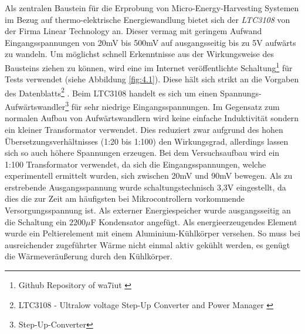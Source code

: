 \documentclass[12pt]{scrreprt} %
\begin{document}
Als zentralen Baustein für die Erprobung von Micro-Energy-Harvesting Systemen im Bezug auf thermo-elektrische Energiewandlung bietet sich der \textit{LTC3108} von der Firma Linear Technology an. Dieser vermag mit geringem Aufwand Eingangsspannungen von 20mV bis 500mV auf ausgangsseitig bis zu 5V aufwärts zu wandeln. Um möglichst schnell Erkenntnisse aus der Wirkungsweise des Bausteins ziehen zu können, wird eine im Internet veröffentlichte Schaltung\footnote{Github Repository of wa7iut \citep{git}} für Tests verwendet (siehe Abbildung \vref{fig:4.1}). Diese hält sich strikt an die Vorgaben des Datenblatts\footnote{LTC3108 - Ultralow voltage Step-Up Converter and Power Manager \citep{LTC}} \citep{LTC3108}. Beim LTC3108 handelt es sich um einen Spannungs-Aufwärtswandler\footnote{Step-Up-Converter} für sehr niedrige Eingangsspannungen. Im Gegensatz zum normalen Aufbau von Aufwärtswandlern wird keine einfache Induktivität sondern ein kleiner Transformator verwendet. Dies reduziert zwar aufgrund des hohen Übersetzungsverhältnisses (1:20 bis 1:100) den Wirkungsgrad, allerdings lassen sich so auch höhere Spannungen erzeugen. Bei dem Versuchsaufbau wird ein 1:100 Transformator verwendet, da sich die Eingangsspannungen, welche experimentell ermittelt wurden, sich zwischen 20mV und 90mV bewegen. Als zu erstrebende Ausgangsspannung wurde schaltungstechnisch 3,3V eingestellt, da dies die zur Zeit am häufigsten bei Mikrocontrollern vorkommende Versorgungsspannung ist. Als externer Energiespeicher wurde ausgangsseitig an die Schaltung ein $2200 \mu$F Kondensator angefügt. Als energieerzeugendes Element wurde ein Peltierelement mit einem Aluminium-Kühlkörper versehen. So muss bei ausreichender zugeführter Wärme nicht einmal aktiv gekühlt werden, es genügt die Wärmeveräußerung durch den Kühlkörper.%
\end{document}
